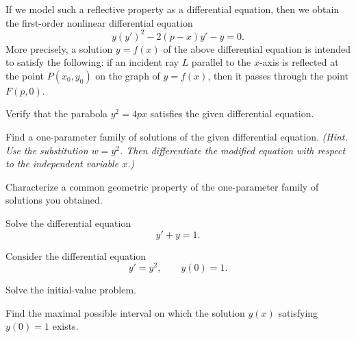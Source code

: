 \begin{problem}
If we model such a reflective property as a differential equation, then we obtain the first-order nonlinear differential equation
\[
y(y')^2-2(p-x)y'-y=0.
\]
More precisely, a solution $y=f(x)$ of the above differential equation is intended to satisfy the following: if an incident ray $L$ parallel to the $x$-axis is reflected at the point $P(x_0,y_0)$ on the graph of $y=f(x)$, then it passes through the point $F(p,0)$.
\begin{problemsubparts}
\item Verify that the parabola $y^2=4px$ satisfies the given differential equation.
\item Find a one-parameter family of solutions of the given differential equation. \textit{(Hint. Use the substitution $w=y^2$. Then differentiate the modified equation with respect to the independent variable $x$.)}
\item Characterize a common geometric property of the one-parameter family of solutions you obtained.
\end{problemsubparts}
\end{problem}

\begin{problem}
Solve the differential equation
\[
y'+y=1.
\]
\end{problem}

\begin{problem}
Consider the differential equation
\[
y'=y^2,
\qquad
y(0)=1.
\]
\begin{problemsubparts}
\item Solve the initial-value problem.
\item Find the maximal possible interval on which the solution $y(x)$ satisfying $y(0)=1$ exists.
\end{problemsubparts}
\end{problem}

